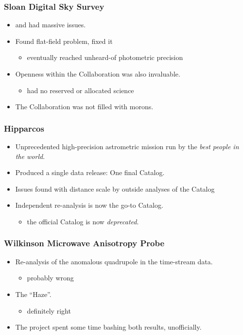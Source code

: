 \documentclass[pdftex]{beamer}
\begin{document}
\begin{frame}
  \frametitle{Sloan Digital Sky Survey}
  \begin{itemize}
  \item {} and  had massive issues.
  \item Found flat-field problem, fixed it
    \begin{itemize}
    \item eventually reached unheard-of photometric precision
    \end{itemize}
  \item Openness within the Collaboration was also invaluable.
    \begin{itemize}
    \item {} had no reserved or allocated science
    \end{itemize}
  \item The Collaboration was not filled with morons.
  \end{itemize}
\end{frame}

\begin{frame}
  \frametitle{Hipparcos}
  \begin{itemize}
  \item Unprecedented high-precision astrometric mission run by the \emph{best people in the world}.
  \item Produced a single data release: One final Catalog.
  \item Issues found with distance scale by outside analyses of the Catalog
  \item Independent re-analysis is now the go-to Catalog.
    \begin{itemize}
    \item the official  Catalog is now \emph{deprecated}.
    \end{itemize}
  \end{itemize}
\end{frame}

\begin{frame}
  \frametitle{Wilkinson Microwave Anisotropy Probe}
  \begin{itemize}
  \item Re-analysis of the anomalous quadrupole in the time-stream data.
    \begin{itemize}
    \item probably wrong
    \end{itemize}
  \item The ``Haze''.
    \begin{itemize}
    \item definitely right
    \end{itemize}
  \item The project spent some time bashing both results, unofficially.
  \end{itemize}
\end{frame}
\end{document}
